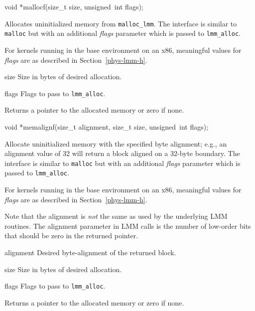 \label{mallocf}
\begin{apisyn}

	\funcproto void *mallocf(size_t size, unsigned~int flags);
\end{apisyn}
\begin{apidesc}
	Allocates uninitialized memory from {\tt malloc_lmm}.
	The interface is similar to {\tt malloc} but with an additional
	\emph{flags} parameter which is passed to {\tt lmm_alloc}.
	
	For kernels running in the base environment on an x86,
	meaningful values for \emph{flags} are as described in
	Section~\ref{phys-lmm-h}.
\end{apidesc}
\begin{apiparm}
	\item[size]
		Size in bytes of desired allocation.
	\item[flags]
		Flags to pass to {\tt lmm_alloc}.
\end{apiparm}
\begin{apiret}
	Returns a pointer to the allocated memory or zero if none.
\end{apiret}

\label{memalignf}
\begin{apisyn}

	\funcproto void *memalignf(size_t alignment, size_t size,
		 unsigned~int flags);
\end{apisyn}
\begin{apidesc}
	Allocate uninitialized memory with the specified byte alignment;
	e.g., an alignment value of 32 will return a block aligned on a
	32-byte boundary.
	The interface is similar to {\tt malloc} but with an additional
	\emph{flags} parameter which is passed to {\tt lmm_alloc}.
	
	For kernels running in the base environment on an x86,
	meaningful values for \emph{flags} are as described in
	Section~\ref{phys-lmm-h}.

	Note that the alignment is \emph{not} the same as used by the
	underlying LMM routines.  The alignment parameter in LMM calls
	is the number of low-order bits that should be zero in the
	returned pointer.
\end{apidesc}
\begin{apiparm}
	\item[alignment]
		Desired byte-alignment of the returned block.
	\item[size]
		Size in bytes of desired allocation.
	\item[flags]
		Flags to pass to {\tt lmm_alloc}.
\end{apiparm}
\begin{apiret}
	Returns a pointer to the allocated memory or zero if none.
\end{apiret}

